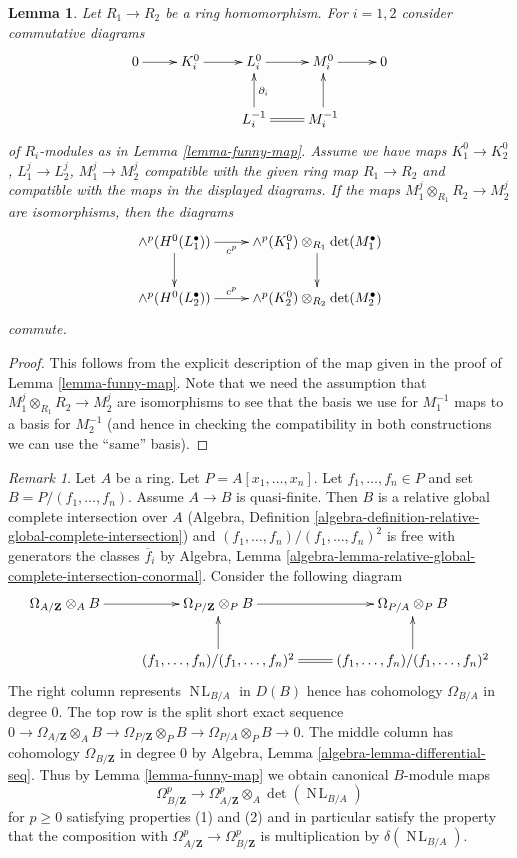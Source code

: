 \documentclass[10pt,a4paper]{amsart}
\theoremstyle{plain}
\newtheorem{lemma}[subsection]{Lemma}
\theoremstyle{definition}
\theoremstyle{remark}
\newtheorem{remark}[subsection]{Remark}
\numberwithin{equation}{subsection}
\def\NL{\mathop{N\!L}\nolimits}
\begin{document}
\begin{lemma}
\label{lemma-funny-map-functorial}
Let $R_1 \to R_2$ be a ring homomorphism. For $i = 1, 2$ consider
commutative diagrams
$$
\xymatrix{
0 \ar[r] &
K_i^0 \ar[r] &
L_i^0 \ar[r] &
M_i^0 \ar[r] & 0 \\
& & L_i^{-1} \ar[u]_{\partial_i} \ar@{=}[r] &
M_i^{-1} \ar[u]
}
$$
of $R_i$-modules as in Lemma \ref{lemma-funny-map}. Assume we have
maps $K_1^0 \to K_2^0$, $L_1^j \to L_2^j$, $M_1^j \to M_2^j$
compatible with the given ring map $R_1 \to R_2$ and
compatible with the maps in the displayed diagrams. If the maps
$M_1^j \otimes_{R_1} R_2 \to M_2^j$ are isomorphisms, then
the diagrams
$$
\xymatrix{ 
\wedge^p(H^0(L_1^\bullet)) \ar[d]
\ar[r]_-{c^p} &
\wedge^p(K_1^0) \otimes_{R_1} \det(M_1^\bullet) \ar[d] \\
\wedge^p(H^0(L_2^\bullet))
\ar[r]^-{c^p} &
\wedge^p(K_2^0) \otimes_{R_2} \det(M_2^\bullet)
}
$$
commute.
\end{lemma}

\begin{proof}
This follows from the explicit description of the map given
in the proof of Lemma \ref{lemma-funny-map}. Note that we need
the assumption that $M_1^j \otimes_{R_1} R_2 \to M_2^j$ are isomorphisms
to see that the basis we use for $M_1^{-1}$ maps to a basis
for $M_2^{-1}$ (and hence in checking the compatibility in
both constructions we can use the ``same'' basis).
\end{proof}

\begin{remark}
\label{remark-local-description}
Let $A$ be a ring. Let $P = A[x_1, \ldots, x_n]$. Let
$f_1, \ldots, f_n \in P$ and set $B = P/(f_1, \ldots, f_n)$.
Assume $A \to B$ is quasi-finite. Then
$B$ is a relative global complete intersection over $A$ (Algebra, Definition
\ref{algebra-definition-relative-global-complete-intersection}) and
$(f_1, \ldots, f_n)/(f_1, \ldots, f_n)^2$ is free with generators
the classes $\overline{f}_i$ by Algebra, Lemma
\ref{algebra-lemma-relative-global-complete-intersection-conormal}.
Consider the following diagram
$$
\xymatrix{
\Omega_{A/\mathbf{Z}} \otimes_A B \ar[r] &
\Omega_{P/\mathbf{Z}} \otimes_P B \ar[r] &
\Omega_{P/A} \otimes_P B \\
&
(f_1, \ldots, f_n)/(f_1, \ldots, f_n)^2 \ar[u] \ar@{=}[r] &
(f_1, \ldots, f_n)/(f_1, \ldots, f_n)^2 \ar[u]
}
$$
The right column represents $\NL_{B/A}$ in $D(B)$ hence has cohomology
$\Omega_{B/A}$ in degree $0$. The top row is the split short exact sequence
$0 \to \Omega_{A/\mathbf{Z}} \otimes_A B \to
\Omega_{P/\mathbf{Z}} \otimes_P B \to \Omega_{P/A} \otimes_P B \to 0$.
The middle column has cohomology $\Omega_{B/\mathbf{Z}}$ in degree $0$
by Algebra, Lemma \ref{algebra-lemma-differential-seq}.
Thus by Lemma \ref{lemma-funny-map} we obtain canonical $B$-module maps
$$
\Omega^p_{B/\mathbf{Z}} \longrightarrow
\Omega^p_{A/\mathbf{Z}} \otimes_A \det(\NL_{B/A})
$$
for $p \geq 0$ satisfying properties (1) and (2) and in particular
satisfy the property that the composition with
$\Omega^p_{A/\mathbf{Z}} \to \Omega^p_{B/\mathbf{Z}}$
is multiplication by $\delta(\NL_{B/A})$.
\end{remark}
\end{document}
